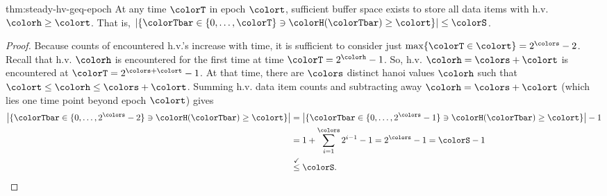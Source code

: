 \begin{lemma} \item{thm:steady-hv-geq-epoch}
At any time $\colorT$ in epoch $\colort$, sufficient buffer space exists to store all data items with h.v. $\colorh \geq \colort$.
That is, $\left| \{\colorTbar \in \{0, \ldots, \colorT \} \ni \colorH(\colorTbar) \geq \colort \} \right| \leq \colorS$.
\end{lemma}

\begin{proof}
Because counts of encountered h.v.'s increase with time, it is sufficient to consider just $\max\{\colorT \in \colort\} = 2^{\colors} - 2$.
Recall that h.v. $\colorh$ is encountered for the first time at time $\colorT = 2^{\colorh} - 1$.
So, h.v. $\colorh = \colors + \colort$ is encountered at $\colorT = 2^{\colors + \colort} - 1$.
At that time, there are $\colors$ distinct hanoi values $\colorh$ such that $\colort \leq \colorh \leq \colors + \colort$.
Summing h.v. data item counts and subtracting away $\colorh = \colors + \colort$ (which lies one time point beyond epoch $\colort$) gives
\begin{align*}
\left| \{\colorTbar \in \{0, \ldots, 2^{\colors} - 2 \} \ni \colorH(\colorTbar) \geq \colort \} \right|
&= \left| \{\colorTbar \in \{0, \ldots, 2^{\colors} - 1 \} \ni \colorH(\colorTbar) \geq \colort \} \right| - 1\\
&= 1 + \sum_{i=1}^{\colors} 2^{i - 1} - 1 = 2^{\colors} - 1 = \colorS - 1\\
&\stackrel{\checkmark}{\leq} \colorS.
\end{align*}
\end{proof}
